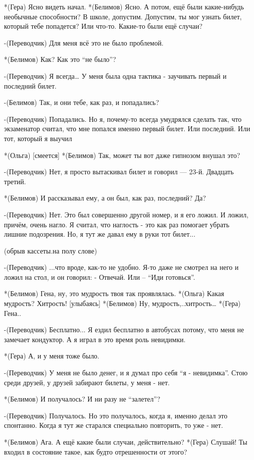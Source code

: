*(Гера) Ясно видеть начал.
*(Белимов) Ясно. А потом, ещё были какие-нибудь необычные способности? В школе, допустим. Допустим, ты мог узнать билет, который тебе попадется? Или что-то. Какие-то были ещё случаи?

-(Переводчик) Для меня всё это не было проблемой.

*(Белимов) Как? Как это “не было”?

-(Переводчик) Я всегда… У меня была одна тактика - заучивать первый и последний билет.

-(Белимов) Так, и они тебе, как раз, и попадались?

-(Переводчик) Попадались. Но я, почему-то всегда умудрялся сделать так, что экзаменатор считал, что мне попался именно первый билет. Или последний. Или тот, который я выучил

*(Ольга) [смеется]
*(Белимов) Так, может ты вот даже гипнозом внушал это?

-(Переводчик) Нет, я просто вытаскивал билет и говорил — 23-й. Двадцать третий.

*(Белимов) И рассказывал ему, а он был, как раз, последний? Да?

-(Переводчик) Нет. Это был совершенно другой номер, и я его ложил. И ложил, причём,  очень нагло. Я считал, что наглость - это как раз помогает убрать лишние подозрения. Но, я тут же давал ему в руки тот билет...

(обрыв кассеты.на полу слове)

-(Переводчик) ...что вроде, как-то не удобно. Я-то даже не смотрел на него и ложил на стол, и он говорил: - Отвечай. Или – “Иди готовься”.

*(Белимов) Гена, ну, это мудрость твоя так проявлялась.
*(Ольга) Какая мудрость? Хитрость! [улыбаясь]
*(Белимов) Ну, мудрость,..хитрость…
*(Гера) Гена.. 

-(Переводчик) Бесплатно... Я ездил бесплатно в автобусах потому, что меня не замечает кондуктор. А я играл в это время роль невидимки.

*(Гера) А, и у меня тоже было.

-(Переводчик) У меня не было денег, и я думал про себя “я - невидимка”. Стою среди друзей, у друзей забирают билеты, у меня - нет. 

*(Белимов) И получалось? И ни разу не “залетел”?

-(Переводчик) Получалось. Но это получалось, когда я, именно делал это спонтанно. Когда я тут же старался  специально повторить, то уже - нет. 

*(Белимов) Ага. А ещё какие были случаи, действительно?
*(Гера) Слушай! Ты входил в состояние такое, как будто отрешенности от этого?

